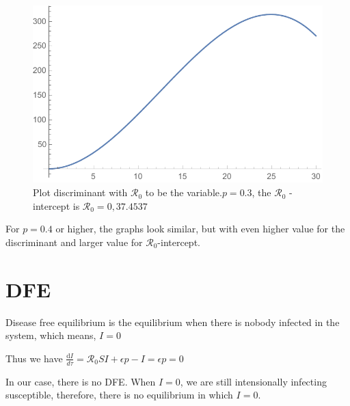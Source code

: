\documentclass[12pt]{article}
\begin{document}
\begin{figure}[H]
  \caption{Plot discriminant with $\mathcal{R}_0$ to be the variable.$p=0.3$, the $\mathcal{R}_0$ -intercept is $\mathcal{R}_0 = 0, 37.4537$}
  \centering
  \includegraphics[width=1.1\textwidth]{Figures/Plot_R_0_p_0_3.pdf}
\end{figure}

For $p=0.4$ or higher, the graphs look similar, but with even higher value for the discriminant and larger value for $\mathcal{R}_0$-intercept.

\section{DFE}

Disease free equilibrium is the equilibrium when there is nobody infected in the system, which means, $I=0$

Thus we have $\frac{\mathrm{d}I}{d\tau}=\mathcal{R}_0 SI+\epsilon p-I=\epsilon p=0$

In our case, there is no DFE. When $I=0$, we are still intensionally infecting susceptible,  therefore, there is no equilibrium in which $I=0$.
\end{document}
